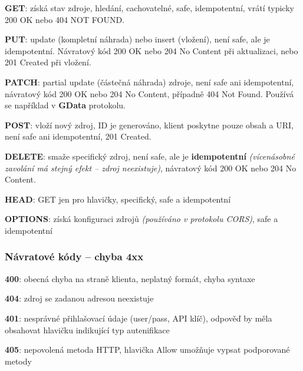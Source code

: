 \textbf{GET}: získá stav zdroje, hledání, cachovatelné, safe, idempotentní, vrátí typicky 200 OK nebo 404 NOT FOUND.

\vspace{2pt}
\noindent \textbf{PUT}: update (kompletní náhrada) nebo insert (vložení), není safe, ale je idempotentní. Návratový kód 200 OK nebo 204 No Content při aktualizaci, nebo 201 Created při vložení.

\vspace{2pt}
\noindent \textbf{PATCH}: partial update (částečná náhrada) zdroje, není safe ani idempotentní, návratový kód 200 OK nebo 204 No Content, případně 404 Not Found. Používá se například v \textbf{GData} protokolu.

\vspace{2pt}
\noindent \textbf{POST}: vloží nový zdroj, ID je generováno, klient poskytne pouze obsah a URI, není safe ani idempotentní, 201 Created.

\vspace{2pt}
\noindent \textbf{DELETE}: smaže specifický zdroj, není safe, ale je \textbf{idempotentní} \textit{(vícenásobné zavolání má stejný efekt -- zdroj neexistuje)}, návratový kód 200 OK nebo 204 No Content.

\vspace{2pt}
\noindent \textbf{HEAD}: GET jen pro hlavičky, specifický, safe a idempotentní

\vspace{2pt}
\noindent \textbf{OPTIONS}: získá konfiguraci zdrojů \textit{(používáno v protokolu CORS)}, safe a idempotentní

\subsubsection*{Návratové kódy -- chyba 4xx}

\textbf{400}: obecná chyba na straně klienta, neplatný formát, chyba syntaxe

\vspace{2pt}
\noindent \textbf{404}: zdroj se zadanou adresou neexistuje

\vspace{2pt}
\noindent \textbf{401}: nesprávné přihlašovací údaje (user/pass, API klíč), odpověď by měla obsahovat hlavičku indikující typ autenifikace

\vspace{2pt}
\noindent \textbf{405}: nepovolená metoda HTTP, hlavička Allow umožňuje vypsat podporované metody

